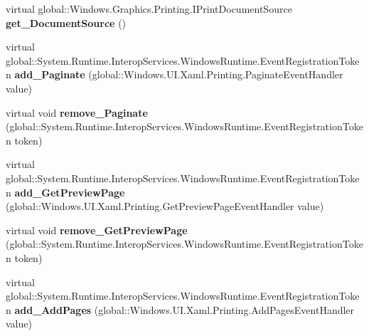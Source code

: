 \begin{DoxyCompactItemize}
virtual global\+::\+Windows.\+Graphics.\+Printing.\+I\+Print\+Document\+Source {\bfseries get\+\_\+\+Document\+Source} ()
\item 
\mbox{\label{class_windows_1_1_u_i_1_1_xaml_1_1_printing_1_1_print_document_a9c15072b2efeea170b01106af19c20d2}} 
virtual global\+::\+System.\+Runtime.\+Interop\+Services.\+Windows\+Runtime.\+Event\+Registration\+Token {\bfseries add\+\_\+\+Paginate} (global\+::\+Windows.\+U\+I.\+Xaml.\+Printing.\+Paginate\+Event\+Handler value)
\item 
\mbox{\label{class_windows_1_1_u_i_1_1_xaml_1_1_printing_1_1_print_document_af8447e29ab1c6aeff221a7ecf57c48a5}} 
virtual void {\bfseries remove\+\_\+\+Paginate} (global\+::\+System.\+Runtime.\+Interop\+Services.\+Windows\+Runtime.\+Event\+Registration\+Token token)
\item 
\mbox{\label{class_windows_1_1_u_i_1_1_xaml_1_1_printing_1_1_print_document_a7f3e8c94058352a6d36e6c86a1f14425}} 
virtual global\+::\+System.\+Runtime.\+Interop\+Services.\+Windows\+Runtime.\+Event\+Registration\+Token {\bfseries add\+\_\+\+Get\+Preview\+Page} (global\+::\+Windows.\+U\+I.\+Xaml.\+Printing.\+Get\+Preview\+Page\+Event\+Handler value)
\item 
\mbox{\label{class_windows_1_1_u_i_1_1_xaml_1_1_printing_1_1_print_document_a049493be7cb40ba87e23a1fff9cca61a}} 
virtual void {\bfseries remove\+\_\+\+Get\+Preview\+Page} (global\+::\+System.\+Runtime.\+Interop\+Services.\+Windows\+Runtime.\+Event\+Registration\+Token token)
\item 
\mbox{\label{class_windows_1_1_u_i_1_1_xaml_1_1_printing_1_1_print_document_abcf27815570562c0335caae5ab74ff34}} 
virtual global\+::\+System.\+Runtime.\+Interop\+Services.\+Windows\+Runtime.\+Event\+Registration\+Token {\bfseries add\+\_\+\+Add\+Pages} (global\+::\+Windows.\+U\+I.\+Xaml.\+Printing.\+Add\+Pages\+Event\+Handler value)
\item 
\mbox{\label{class_windows_1_1_u_i_1_1_xaml_1_1_printing_1_1_print_document_ac0b62cd4a9c0d95589b9afcb1f7a0082}} 

\end{DoxyCompactItemize}
